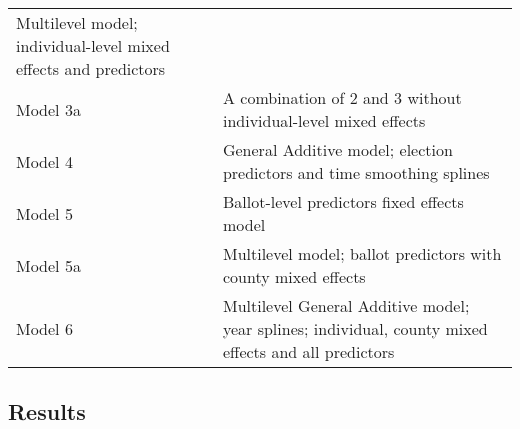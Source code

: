 \documentclass[12pt,twoside]{reedthesis}
\begin{document}
\begin{longtable}[]{@{}ll@{}}
\begin{minipage}[t]{0.80\columnwidth}
  Multilevel model; individual-level mixed effects and predictors\strut
  \end{minipage}\tabularnewline
  \begin{minipage}[t]{0.15\columnwidth}\raggedright\strut
  Model 3a\strut
  \end{minipage} & \begin{minipage}[t]{0.80\columnwidth}\raggedright\strut
  A combination of 2 and 3 without individual-level mixed effects\strut
  \end{minipage}\tabularnewline
  \begin{minipage}[t]{0.15\columnwidth}\raggedright\strut
  Model 4\strut
  \end{minipage} & \begin{minipage}[t]{0.80\columnwidth}\raggedright\strut
  General Additive model; election predictors and time smoothing
  splines\strut
  \end{minipage}\tabularnewline
  \begin{minipage}[t]{0.15\columnwidth}\raggedright\strut
  Model 5\strut
  \end{minipage} & \begin{minipage}[t]{0.80\columnwidth}\raggedright\strut
  Ballot-level predictors fixed effects model\strut
  \end{minipage}\tabularnewline
  \begin{minipage}[t]{0.15\columnwidth}\raggedright\strut
  Model 5a\strut
  \end{minipage} & \begin{minipage}[t]{0.80\columnwidth}\raggedright\strut
  Multilevel model; ballot predictors with county mixed effects\strut
  \end{minipage}\tabularnewline
  \begin{minipage}[t]{0.15\columnwidth}\raggedright\strut
  Model 6\strut
  \end{minipage} & \begin{minipage}[t]{0.80\columnwidth}\raggedright\strut
  Multilevel General Additive model; year splines; individual, county
  mixed effects and all predictors\strut
  \end{minipage}\tabularnewline
  \bottomrule
  \end{longtable}
  
  \subsection{Results}\label{results-1}
  
\end{document}
